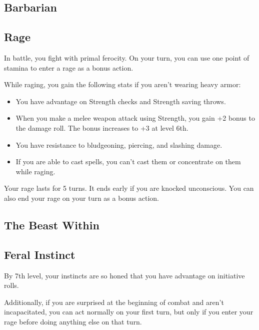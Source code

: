 
\begin{multicols*}{2}



\section{Barbarian}

\subsection*{Rage}

In battle, you fight with primal ferocity. On your turn, you can use one point of stamina to enter a rage as a bonus action.



While raging, you gain the following stats if you aren’t wearing heavy armor:


\begin{itemize}
    \item You have advantage on Strength checks and Strength saving throws.
    \item When you make a melee weapon attack using Strength, you gain +2 bonus to the damage roll. The bonus increases to +3 at level 6th.
    \item You have resistance to bludgeoning, piercing, and slashing damage.
    \item If you are able to cast spells, you can’t cast them or concentrate on them while raging.
\end{itemize}


Your rage lasts for 5 turns. It ends early if you are knocked unconscious. You can also end your rage on your turn as a bonus action.



\subsection*{The Beast Within}

\subsection*{Feral Instinct}

By 7th level, your instincts are so honed that you have advantage on initiative rolls.

Additionally, if you are surprised at the beginning of combat and aren’t incapacitated, you can act normally on your first turn, but only if you enter your rage before doing anything else on that turn.


\end{multicols*}
